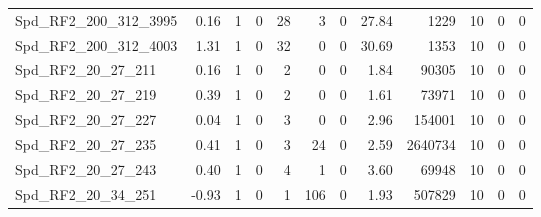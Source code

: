\begin{longtable}[c]{@{}lrrrrrrrrrrr@{}}
Spd\_RF2\_200\_312\_3995     & 0.16                   & 1                       & 0                       & 28                     & 3                       & 0                       & 27.84                   & 1229                     & 10                       & 0                        & 0                        \\
Spd\_RF2\_200\_312\_4003     & 1.31                   & 1                       & 0                       & 32                     & 0                       & 0                       & 30.69                   & 1353                     & 10                       & 0                        & 0                        \\
Spd\_RF2\_20\_27\_211        & 0.16                   & 1                       & 0                       & 2                      & 0                       & 0                       & 1.84                    & 90305                    & 10                       & 0                        & 0                        \\
Spd\_RF2\_20\_27\_219        & 0.39                   & 1                       & 0                       & 2                      & 0                       & 0                       & 1.61                    & 73971                    & 10                       & 0                        & 0                        \\
Spd\_RF2\_20\_27\_227        & 0.04                   & 1                       & 0                       & 3                      & 0                       & 0                       & 2.96                    & 154001                   & 10                       & 0                        & 0                        \\
Spd\_RF2\_20\_27\_235        & 0.41                   & 1                       & 0                       & 3                      & 24                      & 0                       & 2.59                    & 2640734                  & 10                       & 0                        & 0                        \\
Spd\_RF2\_20\_27\_243        & 0.40                   & 1                       & 0                       & 4                      & 1                       & 0                       & 3.60                    & 69948                    & 10                       & 0                        & 0                        \\
Spd\_RF2\_20\_34\_251        & -0.93                  & 1                       & 0                       & 1                      & 106                     & 0                       & 1.93                    & 507829                   & 10                       & 0                        & 0                        \\

\end{longtable}
